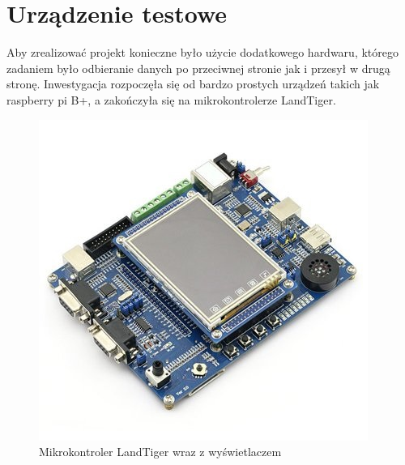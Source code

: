 \documentclass{BscUS}
\begin{document}
\chapter{Urządzenie testowe}
\label{microcontrollerChapter}
Aby zrealizować projekt konieczne było użycie dodatkowego hardwaru, którego zadaniem było odbieranie danych po przeciwnej stronie jak i przesył w drugą stronę. Inwestygacja rozpoczęła się od bardzo prostych urządzeń takich jak raspberry pi B+, a zakończyła się na mikrokontrolerze LandTiger.

\begin{figure}[h]
\centering
\includegraphics{./img/landTiger}
\caption{Mikrokontroler LandTiger wraz z wyświetlaczem \cite{landtigerDesc}}
\end{figure}
\end{document}
